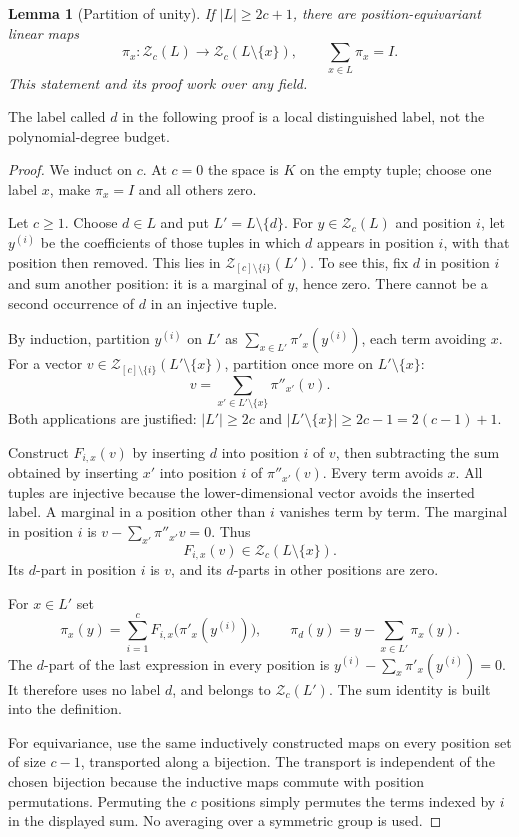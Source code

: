 \documentclass[11pt,a4paper]{article}
\newtheorem{lemma}[theorem]{Lemma}
\theoremstyle{definition}\newtheorem{definition}[theorem]{Definition}
\theoremstyle{remark}\newtheorem{remark}[theorem]{Remark}
\begin{document}
\begin{lemma}[Partition of unity]\label{lem:unity}
If $|L|\ge2c+1$, there are position-equivariant linear maps
\[\pi_x:\mathcal Z_c(L)\longrightarrow \mathcal Z_c(L\setminus\{x\}),\qquad
\sum_{x\in L}\pi_x=I.
\]
This statement and its proof work over any field.
\end{lemma}
The label called $d$ in the following proof is a local distinguished
label, not the polynomial-degree budget.
\begin{proof}
We induct on $c$. At $c=0$ the space is $K$ on the empty tuple; choose one label $x$, make $\pi_x=I$ and all others zero.

Let $c\ge1$. Choose $d\in L$ and put $L'=L\setminus\{d\}$. For $y\in \mathcal Z_c(L)$ and position $i$, let $y^{(i)}$ be the coefficients of those tuples in which $d$ appears in position $i$, with that position then removed. This lies in $\mathcal Z_{[c]\setminus\{i\}}(L')$. To see this, fix $d$ in position $i$ and sum another position: it is a marginal of $y$, hence zero. There cannot be a second occurrence of $d$ in an injective tuple.

By induction, partition $y^{(i)}$ on $L'$ as $\sum_{x\in L'}\pi'_x(y^{(i)})$, each term avoiding $x$. For a vector $v\in \mathcal Z_{[c]\setminus\{i\}}(L'\setminus\{x\})$, partition once more on $L'\setminus\{x\}$:
\[v=\sum_{x'\in L'\setminus\{x\}}\pi''_{x'}(v).
\]
Both applications are justified: $|L'|\ge2c$ and $|L'\setminus\{x\}|\ge2c-1=2(c-1)+1$.

Construct $F_{i,x}(v)$ by inserting $d$ into position $i$ of $v$, then subtracting the sum obtained by inserting $x'$ into position $i$ of $\pi''_{x'}(v)$. Every term avoids $x$. All tuples are injective because the lower-dimensional vector avoids the inserted label. A marginal in a position other than $i$ vanishes term by term. The marginal in position $i$ is $v-\sum_{x'}\pi''_{x'}v=0$. Thus
\[F_{i,x}(v)\in \mathcal Z_c(L\setminus\{x\}).
\]
Its $d$-part in position $i$ is $v$, and its $d$-parts in other positions are zero.

For $x\in L'$ set
\[\pi_x(y)=\sum_{i=1}^cF_{i,x}\bigl(\pi'_x(y^{(i)})\bigr),\qquad
\pi_d(y)=y-\sum_{x\in L'}\pi_x(y).
\]
The $d$-part of the last expression in every position is $y^{(i)}-\sum_x\pi'_x(y^{(i)})=0$. It therefore uses no label $d$, and belongs to $\mathcal Z_c(L')$. The sum identity is built into the definition.

For equivariance, use the same inductively constructed maps on every position set of size $c-1$, transported along a bijection. The transport is independent of the chosen bijection because the inductive maps commute with position permutations. Permuting the $c$ positions simply permutes the terms indexed by $i$ in the displayed sum. No averaging over a symmetric group is used.
\end{proof}
\end{document}
